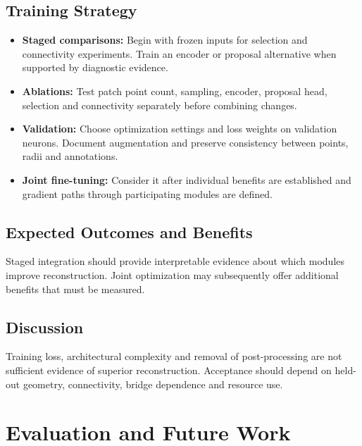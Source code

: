 \documentclass[11pt,a4paper]{article}
\begin{document}
\subsection{Training Strategy}
\begin{itemize}
    \item \textbf{Staged comparisons:} Begin with frozen inputs for selection and connectivity experiments. Train an encoder or proposal alternative when supported by diagnostic evidence.
    \item \textbf{Ablations:} Test patch point count, sampling, encoder, proposal head, selection and connectivity separately before combining changes.
    \item \textbf{Validation:} Choose optimization settings and loss weights on validation neurons. Document augmentation and preserve consistency between points, radii and annotations.
    \item \textbf{Joint fine-tuning:} Consider it after individual benefits are established and gradient paths through participating modules are defined.
\end{itemize}

\subsection{Expected Outcomes and Benefits}
Staged integration should provide interpretable evidence about which modules improve reconstruction. Joint optimization may subsequently offer additional benefits that must be measured.

\subsection{Discussion}
Training loss, architectural complexity and removal of post-processing are not sufficient evidence of superior reconstruction. Acceptance should depend on held-out geometry, connectivity, bridge dependence and resource use.

\section{Evaluation and Future Work}
\end{document}
